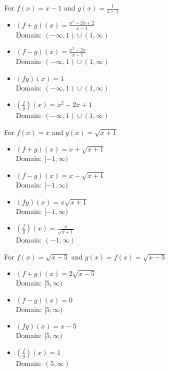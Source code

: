 \begin{exenum}
\item For   $f(x) =x-1$ and $g(x) = \frac{1}{x-1}$

\begin{itemize}
\item $(f+g)(x) = \frac{x^2-2x+2}{x-1}$ \\
      Domain: $(-\infty, 1) \cup (1, \infty)$
\item $(f-g)(x) = \frac{x^2-2x}{x-1}$ \\
      Domain:  $(-\infty,1) \cup (1, \infty)$
\item $(fg)(x) = 1$ \\
      Domain: $(-\infty,1) \cup (1, \infty)$
\item $\left(\frac{f}{g}\right)(x) =x^2-2x+1$ \\
      Domain: $(-\infty,1) \cup (1, \infty)$
\end{itemize}

\item For   $f(x) =x$ and $g(x) = \sqrt{x+1}$

\begin{itemize}
\item $(f+g)(x) = x+\sqrt{x+1}$ \\
      Domain: $[-1,\infty)$
\item $(f-g)(x) = x-\sqrt{x+1}$ \\
       Domain: $[-1,\infty)$
\item $(fg)(x) = x\sqrt{x+1}$ \\
       Domain: $[-1,\infty)$
\item $\left(\frac{f}{g}\right)(x) =\frac{x}{\sqrt{x+1}}$ \\
       Domain: $(-1,\infty)$
\end{itemize}

\item For   $f(x) = \sqrt{x-5}$ and $g(x) = f(x) = \sqrt{x-5}$

\begin{itemize}
\item $(f+g)(x) = 2\sqrt{x-5}$ \\
      Domain: $[5,\infty)$
\item $(f-g)(x) =0$ \\
       Domain: $[5,\infty)$
\item $(fg)(x) =x-5$ \\
       Domain: $[5,\infty)$
\item $\left(\frac{f}{g}\right)(x) =1$ \\
       Domain: $(5,\infty)$
\end{itemize}


\end{exenum}
